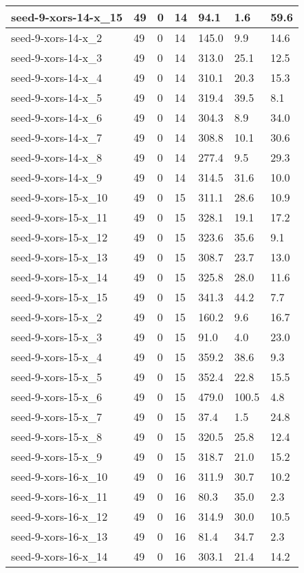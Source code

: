 \begin{scriptsize}
\begin{longtable}{|p{5cm}|l|l|l|l|l|l|}
seed-9-xors-14-x\_15&49&0&14&94.1&1.6&59.6 \\ \hline 
seed-9-xors-14-x\_2&49&0&14&145.0&9.9&14.6 \\ \hline 
seed-9-xors-14-x\_3&49&0&14&313.0&25.1&12.5 \\ \hline 
seed-9-xors-14-x\_4&49&0&14&310.1&20.3&15.3 \\ \hline 
seed-9-xors-14-x\_5&49&0&14&319.4&39.5&8.1 \\ \hline 
seed-9-xors-14-x\_6&49&0&14&304.3&8.9&34.0 \\ \hline 
seed-9-xors-14-x\_7&49&0&14&308.8&10.1&30.6 \\ \hline 
seed-9-xors-14-x\_8&49&0&14&277.4&9.5&29.3 \\ \hline 
seed-9-xors-14-x\_9&49&0&14&314.5&31.6&10.0 \\ \hline 
seed-9-xors-15-x\_10&49&0&15&311.1&28.6&10.9 \\ \hline 
seed-9-xors-15-x\_11&49&0&15&328.1&19.1&17.2 \\ \hline 
seed-9-xors-15-x\_12&49&0&15&323.6&35.6&9.1 \\ \hline 
seed-9-xors-15-x\_13&49&0&15&308.7&23.7&13.0 \\ \hline 
seed-9-xors-15-x\_14&49&0&15&325.8&28.0&11.6 \\ \hline 
seed-9-xors-15-x\_15&49&0&15&341.3&44.2&7.7 \\ \hline 
seed-9-xors-15-x\_2&49&0&15&160.2&9.6&16.7 \\ \hline 
seed-9-xors-15-x\_3&49&0&15&91.0&4.0&23.0 \\ \hline 
seed-9-xors-15-x\_4&49&0&15&359.2&38.6&9.3 \\ \hline 
seed-9-xors-15-x\_5&49&0&15&352.4&22.8&15.5 \\ \hline 
seed-9-xors-15-x\_6&49&0&15&479.0&100.5&4.8 \\ \hline 
seed-9-xors-15-x\_7&49&0&15&37.4&1.5&24.8 \\ \hline 
seed-9-xors-15-x\_8&49&0&15&320.5&25.8&12.4 \\ \hline 
seed-9-xors-15-x\_9&49&0&15&318.7&21.0&15.2 \\ \hline 
seed-9-xors-16-x\_10&49&0&16&311.9&30.7&10.2 \\ \hline 
seed-9-xors-16-x\_11&49&0&16&80.3&35.0&2.3 \\ \hline 
seed-9-xors-16-x\_12&49&0&16&314.9&30.0&10.5 \\ \hline 
seed-9-xors-16-x\_13&49&0&16&81.4&34.7&2.3 \\ \hline 
seed-9-xors-16-x\_14&49&0&16&303.1&21.4&14.2 \\ \hline 

\end{longtable}
\end{scriptsize}
